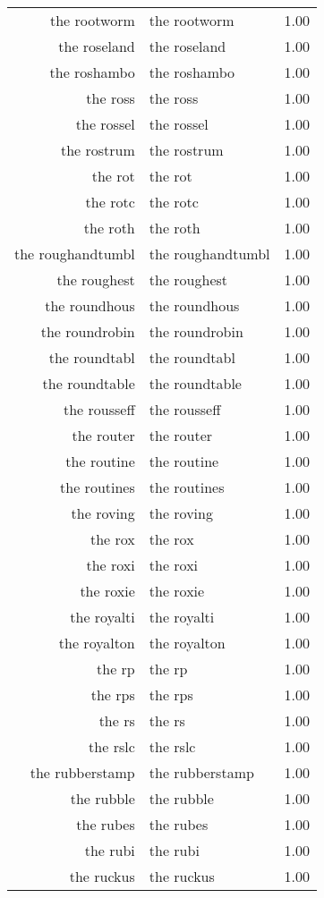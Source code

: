 \begin{table}[ht]
\begin{tabular}{rlr}
  the rootworm & the rootworm & 1.00 \\ 
  the roseland & the roseland & 1.00 \\ 
  the roshambo & the roshambo & 1.00 \\ 
  the ross & the ross & 1.00 \\ 
  the rossel & the rossel & 1.00 \\ 
  the rostrum & the rostrum & 1.00 \\ 
  the rot & the rot & 1.00 \\ 
  the rotc & the rotc & 1.00 \\ 
  the roth & the roth & 1.00 \\ 
  the roughandtumbl & the roughandtumbl & 1.00 \\ 
  the roughest & the roughest & 1.00 \\ 
  the roundhous & the roundhous & 1.00 \\ 
  the roundrobin & the roundrobin & 1.00 \\ 
  the roundtabl & the roundtabl & 1.00 \\ 
  the roundtable & the roundtable & 1.00 \\ 
  the rousseff & the rousseff & 1.00 \\ 
  the router & the router & 1.00 \\ 
  the routine & the routine & 1.00 \\ 
  the routines & the routines & 1.00 \\ 
  the roving & the roving & 1.00 \\ 
  the rox & the rox & 1.00 \\ 
  the roxi & the roxi & 1.00 \\ 
  the roxie & the roxie & 1.00 \\ 
  the royalti & the royalti & 1.00 \\ 
  the royalton & the royalton & 1.00 \\ 
  the rp & the rp & 1.00 \\ 
  the rps & the rps & 1.00 \\ 
  the rs & the rs & 1.00 \\ 
  the rslc & the rslc & 1.00 \\ 
  the rubberstamp & the rubberstamp & 1.00 \\ 
  the rubble & the rubble & 1.00 \\ 
  the rubes & the rubes & 1.00 \\ 
  the rubi & the rubi & 1.00 \\ 
  the ruckus & the ruckus & 1.00 \\ 

\end{tabular}
\end{table}
